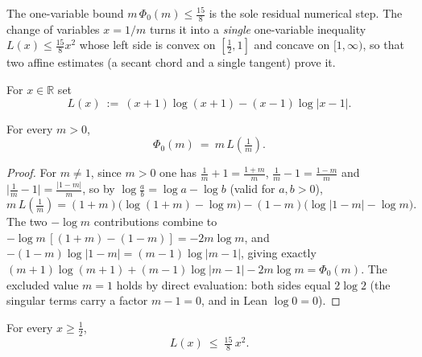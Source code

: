 The one-variable bound $m\,\Phi_0(m)\le\tfrac{15}8$ is the sole residual numerical
step. The change of variables $x=1/m$ turns it into a \emph{single} one-variable
inequality $L(x)\le\tfrac{15}8x^2$ whose left side is convex on $[\tfrac12,1]$ and
concave on $[1,\infty)$, so that two affine estimates (a secant chord and a single
tangent) prove it.

\begin{definition}
\label{def:lb_slice_recip}
\leanok
For $x\in\mathbb R$ set
\[
  L(x)\ :=\ (x+1)\log(x+1)-(x-1)\log|x-1| .
\]
\end{definition}

\begin{lemma}
\label{lem:lb_slice_recip_eq}
\leanok
{}
For every $m>0$,
\[
  \Phi_0(m)\ =\ m\,L\!\left(\tfrac1m\right).
\]
\end{lemma}

\begin{proof}
\leanok
{}
For $m\neq1$, since $m>0$ one has $\tfrac1m+1=\tfrac{1+m}m$, $\tfrac1m-1=\tfrac{1-m}m$
and $\bigl|\tfrac1m-1\bigr|=\tfrac{|1-m|}m$, so by $\log\tfrac ab=\log a-\log b$
(valid for $a,b>0$),
\[
  m\,L\!\left(\tfrac1m\right)
  =(1+m)\bigl(\log(1+m)-\log m\bigr)-(1-m)\bigl(\log|1-m|-\log m\bigr).
\]
The two $-\log m$ contributions combine to $-\log m\,[(1+m)-(1-m)]=-2m\log m$, and
$-(1-m)\log|1-m|=(m-1)\log|m-1|$, giving exactly
$(m+1)\log(m+1)+(m-1)\log|m-1|-2m\log m=\Phi_0(m)$. The excluded value $m=1$ holds by
direct evaluation: both sides equal $2\log2$ (the singular terms carry a factor
$m-1=0$, and in Lean $\log 0=0$).
\end{proof}

\begin{lemma}
\label{lem:lb_slice_recip_bound}
\leanok
{}
For every $x\ge\tfrac12$,
\[
  L(x)\ \le\ \tfrac{15}{8}\,x^2 .
\]
\end{lemma}

